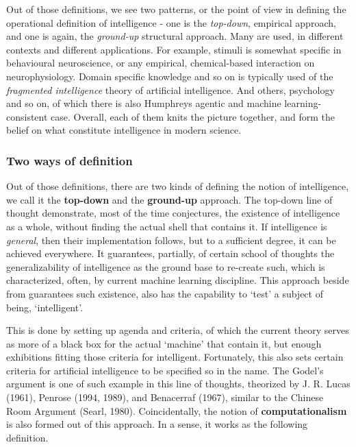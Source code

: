 Out of those definitions, we see two patterns, or the point of view in defining the operational definition of intelligence - one is the \textit{top-down}, empirical approach, and one is again, the \textit{ground-up} structural approach. Many are used, in different contexts and different applications. For example, stimuli is somewhat specific in behavioural neuroscience, or any empirical, chemical-based interaction on neurophysiology. Domain specific knowledge and so on is typically used of the \textit{fragmented intelligence} theory of artificial intelligence. And others, psychology and so on, of which there is also Humphreys agentic and machine learning-consistent case. Overall, each of them knits the picture together, and form the belief on what constitute intelligence in modern science. 

\subsubsection{Two ways of definition}
Out of those definitions, there are two kinds of defining the notion of intelligence, we call it the \textbf{top-down} and the \textbf{ground-up} approach. The top-down line of thought demonstrate, most of the time conjectures, the existence of intelligence as a whole, without finding the actual shell that contains it. If intelligence is \textit{general}, then their implementation follows, but to a sufficient degree, it can be achieved everywhere. It guarantees, partially, of certain school of thoughts the generalizability of intelligence as the ground base to re-create such, which is characterized, often, by current machine learning discipline. This approach beside from guarantees such existence, also has the capability to `test' a subject of being, `intelligent'. 
\vspace{2mm}

This is done by setting up agenda and criteria, of which the current theory serves as more of a black box for the actual `machine' that contain it, but enough exhibitions fitting those criteria for intelligent. Fortunately, this also sets certain criteria for artificial intelligence to be specified so in the name. The Godel's argument is one of such example in this line of thoughts, theorized by J. R. Lucas (1961), Penrose (1994, 1989), and Benacerraf (1967), similar to the Chinese Room Argument (Searl, 1980). Coincidentally, the notion of \textbf{computationalism} is also formed out of this approach. In a sense, it works as the following definition.


